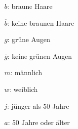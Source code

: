 \begin{exercise}
\begin{minipage}{0.58\linewidth}
\begin{itemize}
        \item[$b$:]\glqq braune Haare\grqq
        \item[$\overline{b}$:]\glqq keine braunen Haare\grqq
        \item[$g$:]\glqq grüne Augen\grqq
        \item[$\overline{g}$:]\glqq keine grünen Augen\grqq
      \end{itemize}
    \end{minipage}\par
    \begin{minipage}{0.41\linewidth}
      \begin{fofotab}%
      \end{fofotab}
    \end{minipage}%
    \begin{minipage}{0.58\linewidth}
      \begin{itemize}
        \renewcommand{\itemsep}{-1ex}%
        \item[$m$:]\glqq männlich\grqq
        \item[$w$:]\glqq weiblich\grqq
        \item[$j$:]\glqq jünger als \num{50} Jahre\grqq
        \item[$a$:]\glqq \num{50} Jahre oder älter\grqq
      \end{itemize}
    \end{minipage}\par
    \begin{minipage}{0.41\linewidth}
      \begin{fofotab}%
      \end{fofotab}
    \end{minipage}%
    \begin{minipage}{0.58\linewidth}

\end{minipage}
\end{exercise}
